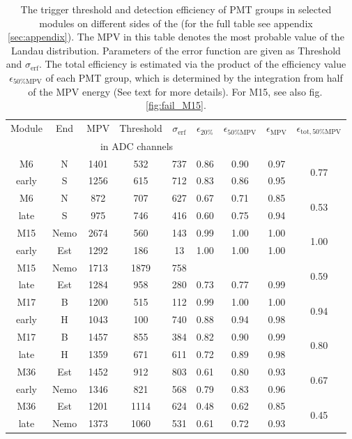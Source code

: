 \begin{table}[htb!]
  \caption{The trigger threshold and detection efficiency of PMT groups in selected modules on different sides of the \mvs{} (for the full table see appendix \ref{sec:appendix}). The MPV in this table denotes the most probable value of the Landau distribution. Parameters of the error function are given as Threshold and $\sigma{}_{\mathrm{erf}}$. The total efficiency is estimated via the product of the efficiency value $\epsilon_{50\%\mathrm{MPV}}$ of each PMT group, which is determined by the integration from half of the MPV energy (See text for more details). For M15, see also fig.\,\ref{fig:fail_M15}.}
  \label{tab:efficiency_short}
  \begin{tabular}{c c c c c c c c c}
    \toprule
    Module & End & MPV & Threshold & $\sigma{}_{\mathrm{erf}}$ & $\epsilon_{20\%}$ & $\epsilon_{50\%\mathrm{MPV}}$ & $\epsilon_{\mathrm{MPV}}$ & $\epsilon_{\mathrm{tot}, 50\%\mathrm{MPV}}$ \\
           &     & \multicolumn{3}{|c|}{in ADC channels} &   \\
    \midrule
    M6     & N & 1401 & 532 & 737 & 0.86 & 0.90 & 0.97 & \multirow{2}{*}{0.77}\\
    early  & S & 1256 & 615 & 712 & 0.83 & 0.86 & 0.95 &\\
    M6     & N & 872 & 707 & 627 & 0.67 & 0.71 & 0.85 & \multirow{2}{*}{0.53}\\
    late   & S & 975 & 746 & 416 & 0.60 & 0.75 & 0.94\\
    \midrule
    M15    & Nemo & 2674 & 560 & 143 & 0.99 & 1.00 & 1.00 & \multirow{2}{*}{1.00}\\
    early  & Est & 1292 & 186 & 13 & 1.00 & 1.00 & 1.00\\
    M15    & Nemo & 1713 & 1879 & 758 &  &  &  & \multirow{2}{*}{0.59}\\
    late   & Est & 1284 & 958 & 280 & 0.73 & 0.77 & 0.99 & \\
    \midrule
    M17    & B & 1200 & 515 & 112 & 0.99 & 1.00 & 1.00 & \multirow{2}{*}{0.94}\\
    early  & H & 1043 & 100 & 740 & 0.88 & 0.94 & 0.98 &\\
    M17    & B & 1457 & 855 & 384 & 0.82 & 0.90 & 0.99 & \multirow{2}{*}{0.80} \\
    late   & H & 1359 & 671 & 611 & 0.72 & 0.89 & 0.98 & \\
    \midrule
    M36    & Est & 1452 & 912 & 803 & 0.61 & 0.80 & 0.93 & \multirow{2}{*}{0.67} \\
    early  & Nemo & 1346 & 821 & 568 & 0.79 & 0.83 & 0.96 &\\
    M36    & Est & 1201 & 1114 & 624 & 0.48 & 0.62 & 0.85 & \multirow{2}{*}{0.45}\\
    late   & Nemo & 1373 & 1060 & 531 & 0.61 & 0.72 & 0.93 & \\
    \bottomrule
  \end{tabular}
\end{table}

